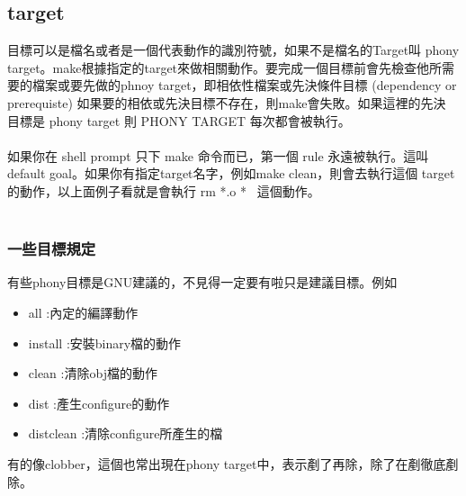   \subsection{target}
  目標可以是檔名或者是一個代表動作的識別符號，如果不是檔名的Target叫 phony 
  target。make根據指定的target來做相關動作。要完成一個目標前會先檢查他所需
  要的檔案或要先做的phnoy target，即相依性檔案或先決條件目標 (dependency 
  or prerequiste) 如果要的相依或先決目標不存在，則make會失敗。如果這裡的先決
  目標是 phony target 則 PHONY TARGET 每次都會被執行。
  \\\\
  如果你在 shell prompt 只下 make 命令而已，第一個 rule 永遠被執行。這叫
  default goal。如果你有指定target名字，例如make clean，則會去執行這個
  target的動作，以上面例子看就是會執行 rm *.o *~ 這個動作。
  \\\\
  \subsubsection{一些目標規定}
  有些phony目標是GNU建議的，不見得一定要有啦只是建議目標。例如
  \begin{itemize}
    \item all           :內定的編譯動作
    \item install       :安裝binary檔的動作
    \item clean         :清除obj檔的動作
    \item dist          :產生configure的動作
    \item distclean	:清除configure所產生的檔
  \end{itemize}
  有的像clobber，這個也常出現在phony target中，表示剷了再除，除了在剷徹底剷除。
